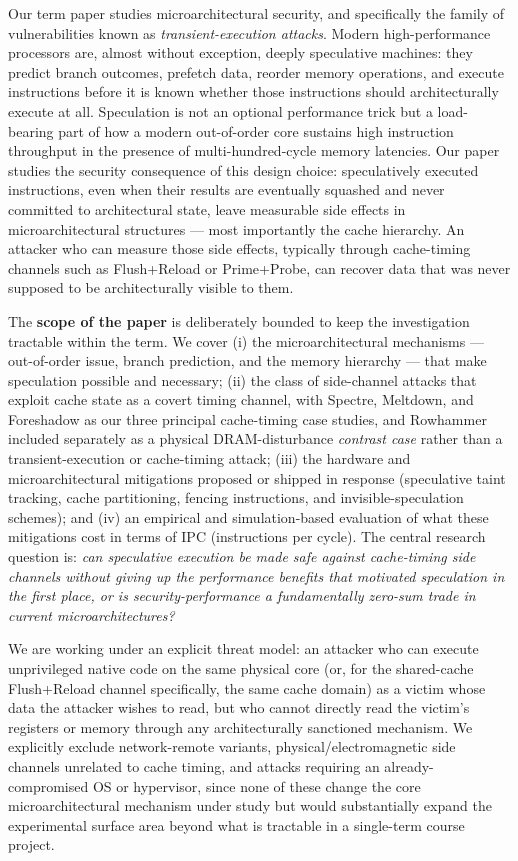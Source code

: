 \documentclass[11pt,a4paper]{article}
\begin{document}
Our term paper studies microarchitectural security, and specifically the family of
vulnerabilities known as \emph{transient-execution attacks}. Modern high-performance
processors are, almost without exception, deeply speculative machines: they predict
branch outcomes, prefetch data, reorder memory operations, and execute instructions
before it is known whether those instructions should architecturally execute at all.
Speculation is not an optional performance trick but a load-bearing part of how a
modern out-of-order core sustains high instruction throughput in the presence of
multi-hundred-cycle memory latencies. Our paper studies the security consequence of
this design choice: speculatively executed instructions, even when their results are
eventually squashed and never committed to architectural state, leave measurable
side effects in microarchitectural structures --- most importantly the cache hierarchy.
An attacker who can measure those side effects, typically through cache-timing
channels such as Flush+Reload or Prime+Probe, can recover data that was never
supposed to be architecturally visible to them.

The \textbf{scope of the paper} is deliberately bounded to keep the investigation tractable
within the term. We cover (i) the microarchitectural mechanisms --- out-of-order
issue, branch prediction, and the memory hierarchy --- that make speculation
possible and necessary; (ii) the class of side-channel attacks that exploit cache state as a covert
timing channel, with Spectre, Meltdown, and Foreshadow as our three principal
cache-timing case studies, and Rowhammer included separately as a physical
DRAM-disturbance \emph{contrast case} rather than a transient-execution or
cache-timing attack; (iii) the hardware and microarchitectural
mitigations proposed or shipped in response (speculative taint tracking, cache
partitioning, fencing instructions, and invisible-speculation schemes); and (iv) an
empirical and simulation-based evaluation of what these mitigations cost in terms
of IPC (instructions per cycle). The central research question is: \emph{can
speculative execution be made safe against cache-timing side channels without
giving up the performance benefits that motivated speculation in the first place,
or is security-performance a fundamentally zero-sum trade in current
microarchitectures?}

We are working under an explicit threat model: an attacker who can execute
unprivileged native code on the same physical core (or, for the shared-cache
Flush+Reload channel specifically, the same cache domain) as a victim whose data
the attacker wishes to read, but who cannot directly read the victim's registers or
memory through any architecturally sanctioned mechanism. We explicitly exclude
network-remote variants, physical/electromagnetic side channels unrelated to cache
timing, and attacks requiring an already-compromised OS or hypervisor, since none
of these change the core microarchitectural mechanism under study but would
substantially expand the experimental surface area beyond what is tractable in a
single-term course project.
\end{document}
